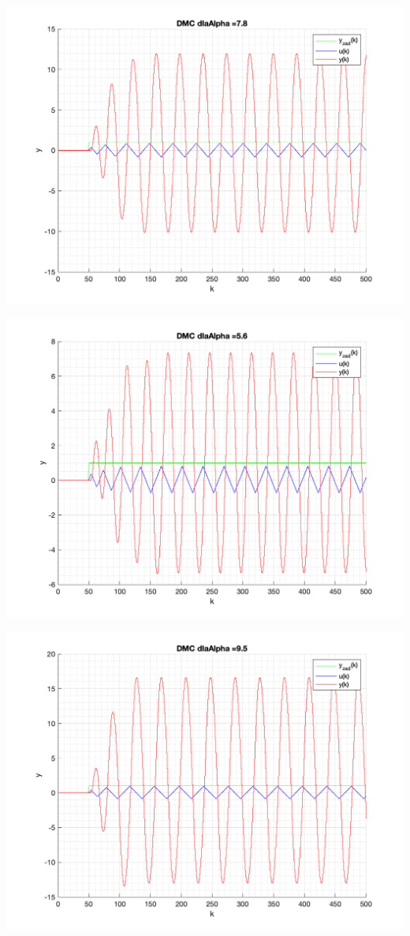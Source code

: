 \documentclass[a4paper, 11pt]{article}
\begin{document}
\begin{enumerate}
 \includegraphics[width=\linewidth]{./ModelsDodatkowe_Alpha/P4_DMC_Alpha_7_8_png.png} 
 
 \includegraphics[width=\linewidth]{./ModelsDodatkowe_Alpha/P4_DMC_Alpha_5_6_png.png} 
 
 \includegraphics[width=\linewidth]{./ModelsDodatkowe_Alpha/P4_DMC_Alpha_9_5_png.png} 
 

\end{enumerate}
\end{document}
